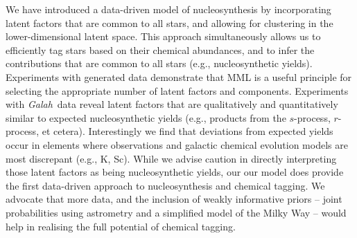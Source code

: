\documentclass[twocolumn]{aastex62}
\newcommand{\project}[1]{\textsl{#1}}
\newcommand{\Galah}{\project{Galah}}
\newcommand{\todo}[1]{\textcolor{red}{#1}}
\begin{document}
We have introduced a data-driven model of nucleosynthesis by incorporating 
latent factors that are common to all stars, and allowing for clustering in the
lower-dimensional latent space. This approach simultaneously allows us to efficiently
tag stars based on their chemical abundances, and to infer the contributions that are
common to all stars (e.g., nucleosynthetic yields). Experiments with generated data
demonstrate that MML is a useful principle for selecting the appropriate number of
latent factors and components. Experiments with \Galah\ data reveal latent factors
that are qualitatively and quantitatively similar to expected nucleosynthetic yields (e.g., products
from the $s$-process, $r$-process, et cetera). Interestingly we find that deviations from
expected yields occur in elements where observations and galactic chemical evolution models
are most discrepant (e.g., K, Sc). While we advise caution in directly interpreting
those latent factors as being nucleosynthetic yields, our
our model does provide the first data-driven approach to nucleosynthesis and chemical tagging. We advocate that more data, and the inclusion of weakly informative priors -- joint probabilities using astrometry and a simplified model of the Milky Way -- would help in realising the full potential of chemical tagging.




\end{document}
